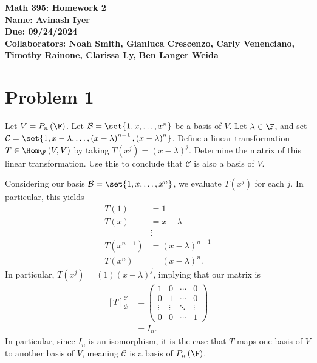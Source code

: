 \documentclass[10pt]{mypackage}
\begin{document}
\RaggedRight
\begin{center}
  \bfseries
  Math 395: Homework 2\\
  Name: Avinash Iyer\\
  Due: 09/24/2024\\
  Collaborators: Noah Smith, Gianluca Crescenzo, Carly Venenciano, Timothy Rainone, Clarissa Ly, Ben Langer Weida
\end{center}
\section{Problem 1}%
\begin{problem}
  Let $V = P_{n}\left(\F\right)$. Let $\mathcal{B} = \set{1,x,\dots,x^n}$ be a basis of $V$. Let $\lambda \in \F$, and set $\mathcal{C} = \set{1,x-\lambda,\dots,\left(x-\lambda\right)^{n-1},\left(x-\lambda\right)^n}$. Define a linear transformation $T\in \Hom_{\F}\left(V,V\right)$ by taking $T\left(x^j\right) = \left(x-\lambda\right)^j$. Determine the matrix of this linear transformation. Use this to conclude that $\mathcal{C}$ is also a basis of $V$.
\end{problem}
\begin{solution}
  Considering our basis $\mathcal{B} = \set{1,x,\dots,x^n}$, we evaluate $T\left(x^j\right)$ for each $j$. In particular, this yields
  \begin{align*}
    T\left(1\right) &= 1\\
    T\left(x\right) &= x-\lambda\\
                    &\vdots\\
    T\left(x^{n-1}\right) &= \left(x-\lambda\right)^{n-1}\\
    T\left(x^n\right) &= \left(x-\lambda\right)^n.
  \end{align*}
  In particular, $T\left(x^j\right) = (1)\left(x-\lambda\right)^j$, implying that our matrix is
  \begin{align*}
    \left[T\right]_{\mathcal{B}}^{\mathcal{C}} &= \begin{pmatrix} 1 & 0 & \cdots & 0 \\ 0 & 1 & \cdots & 0\\ \vdots & \vdots & \ddots & \vdots \\ 0 & 0 & \cdots & 1\end{pmatrix}\\
                                               &= I_{n}.
  \end{align*}
  In particular, since $I_{n}$ is an isomorphism, it is the case that $T$ maps one basis of $V$ to another basis of $V$, meaning $\mathcal{C}$ is a basis of $P_{n}\left(\F\right)$.
\end{solution}
\end{document}
